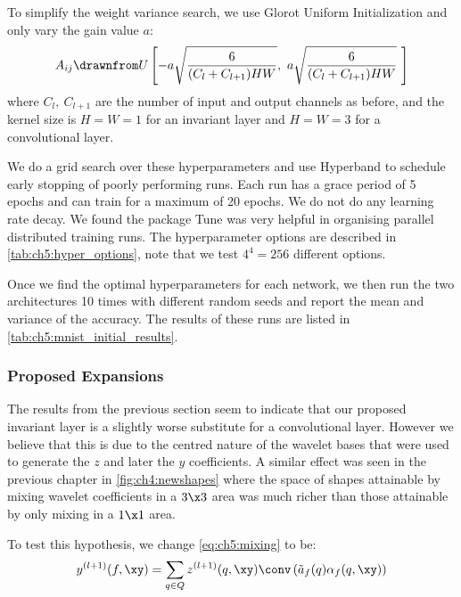 To simplify the weight variance search, we use Glorot Uniform Initialization
\cite{glorot_understanding_2010} and only vary the gain value $a$:
%
\begin{equation}
  A_{ij} \drawnfrom U\left[ -a\sqrt{\frac{6}{(C_l + C_{l+1})HW}},\ a\sqrt{\frac{6}{(C_l + C_{l+1})HW}}\
  \right] \label{eq:ch5:glorot}
\end{equation}
%
where $C_l,\ C_{l+1}$ are the number of input and output channels as before, and
the kernel size is $H = W = 1$ for an invariant layer and $H = W= 3$ for a
convolutional layer.

We do a grid search over these hyperparameters and use Hyperband
\cite{li_hyperband:_2016} to schedule early stopping of poorly performing runs.
Each run has a grace period of 5 epochs and can train for a maximum of 20
epochs. We do not do any learning rate decay.  We found the package Tune
\cite{liaw2018tune} was very helpful in organising parallel distributed training
runs.  
The hyperparameter options are described in
\autoref{tab:ch5:hyper_options}, note that we test $4^4=256$ different options.

Once we find the optimal hyperparameters for each network, we then run the two
architectures 10 times with different random seeds and report the mean and variance of
the accuracy. The results of these runs are listed in
\autoref{tab:ch5:mnist_initial_results}.





\subsubsection{Proposed Expansions}\label{sec:ch5:mnist_newlayer}
The results from the previous section seem to indicate that our proposed
invariant layer is a slightly worse substitute for a convolutional layer.
However we believe that this is due to the centred nature of the wavelet bases
that were used to generate the $z$ and later the $y$ coefficients. A similar
effect was seen in the previous chapter in \autoref{fig:ch4:newshapes} where the
space of shapes attainable by mixing wavelet coefficients in a $3\x 3$ area was
much richer than those attainable by only mixing in a $1\x 1$ area. 

To test this hypothesis, we change \autoref{eq:ch5:mixing} to be:
\begin{equation}
  y^{(l+1)}(f, \xy)  =  \sum_{q \in Q} z^{(l+1)}(q, \xy) \conv \left(\tilde{a}_f(q) \alpha_f(q, \xy) \right)
\end{equation}

